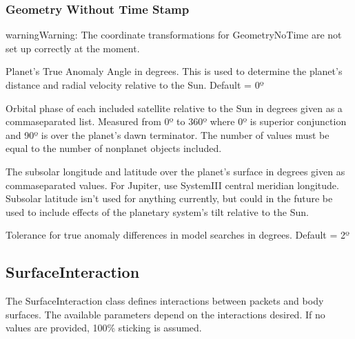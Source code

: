 \documentclass[letterpaper,10pt,english]{sphinxmanual}
\begin{document}
\subsubsection{Geometry Without Time Stamp}
\label{\detokenize{nexoclom2/inputfiles:geometry-without-time-stamp}}\label{\detokenize{nexoclom2/inputfiles:geometrynotime}}
\begin{sphinxadmonition}{warning}{Warning:}
\sphinxAtStartPar
The coordinate transformations for GeometryNoTime are not set up correctly
at the moment.
\end{sphinxadmonition}
\begin{description}
\sphinxAtStartPar
Planet’s True Anomaly Angle in degrees. This is used to determine the
planet’s distance and radial velocity relative to the Sun. Default = 0º

\sphinxAtStartPar
Orbital phase of each included satellite relative to the Sun in degrees given
as a comma\sphinxhyphen{}separated list.
Measured from 0º to 360º where 0º is superior conjunction and
90º is over the planet’s dawn terminator. The number of values must be
equal to the number of non\sphinxhyphen{}planet objects included.

\sphinxAtStartPar
The sub\sphinxhyphen{}solar longitude and latitude over the planet’s surface in degrees
given as comma\sphinxhyphen{}separated values. For Jupiter, use System\sphinxhyphen{}III central
meridian longitude. Sub\sphinxhyphen{}solar latitude isn’t used for anything currently,
but could in the future be used to include effects of the planetary system’s
tilt relative to the Sun.

\sphinxAtStartPar
Tolerance for true anomaly differences in model searches in degrees.
Default = 2º

\end{description}


\subsection{SurfaceInteraction}
\label{\detokenize{nexoclom2/inputfiles:surfaceinteraction}}\label{\detokenize{nexoclom2/inputfiles:surfaceinteractions}}
\sphinxAtStartPar
The SurfaceInteraction class defines interactions between packets and body
surfaces. The available parameters depend on the interactions desired.
If no values are provided, 100\% sticking is assumed.
\end{document}
